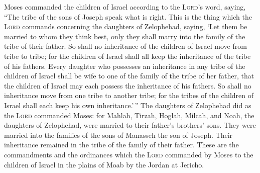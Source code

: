  Moses commanded the children of Israel according to the
\textsc{Lord}'s word, saying, ``The tribe of the sons of Joseph speak
what is right.  This is the thing which the \textsc{Lord}
commands concerning the daughters of Zelophehad, saying, `Let them be
married to whom they think best, only they shall marry into the family
of the tribe of their father.  So shall no inheritance of
the children of Israel move from tribe to tribe; for the children of
Israel shall all keep the inheritance of the tribe of his fathers.
 Every daughter who possesses an inheritance in any tribe
of the children of Israel shall be wife to one of the family of the
tribe of her father, that the children of Israel may each possess the
inheritance of his fathers.  So shall no inheritance move
from one tribe to another tribe; for the tribes of the children of
Israel shall each keep his own inheritance.'\,''  The
daughters of Zelophehad did as the \textsc{Lord} commanded Moses:
 for Mahlah, Tirzah, Hoglah, Milcah, and Noah, the
daughters of Zelophehad, were married to their father's brothers' sons.
 They were married into the families of the sons of
Manasseh the son of Joseph. Their inheritance remained in the tribe of
the family of their father.  These are the commandments
and the ordinances which the \textsc{Lord} commanded by Moses to the
children of Israel in the plains of Moab by the Jordan at Jericho.
